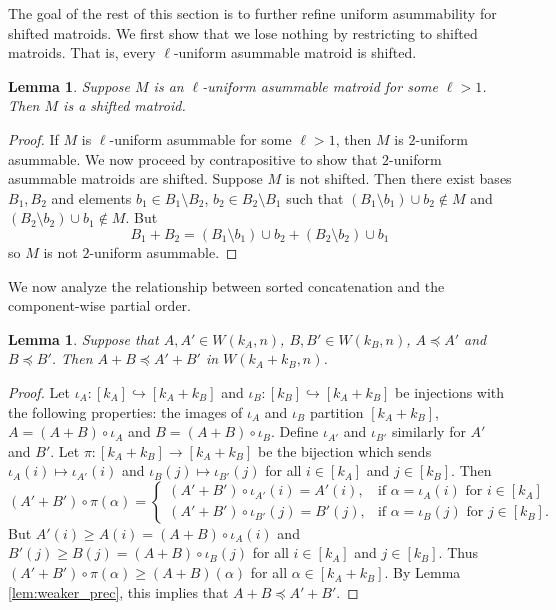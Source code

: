 \documentclass[10pt,a4paper]{amsart}
\theoremstyle{definition}
\theoremstyle{plain}
\newtheorem{lemma}[defn]{Lemma}
\begin{document}
The goal of the rest of this section is to further refine uniform asummability for shifted matroids. We first show that we lose nothing by restricting to shifted matroids. That is, every $\ell$-uniform asummable matroid is shifted.

\begin{lemma}
  \label{lem:assum->shifted}
Suppose $M$ is an $\ell$-uniform asummable matroid for some $\ell>1$. Then $M$ is a shifted matroid.
\end{lemma}
\begin{proof}
  If $M$ is $\ell$-uniform asummable for some $\ell>1$, then $M$ is $2$-uniform asummable. We now proceed by contrapositive to show that $2$-uniform asummable matroids are shifted. Suppose $M$ is not shifted. Then there exist bases $B_1,B_2$ and elements $b_1\in B_1\setminus B_2$, $b_2\in B_2\setminus B_1$ such that $(B_1\setminus b_1)\cup b_2\not\in M$ and $(B_2\setminus b_2)\cup b_1 \not\in M$. But
  \[B_1+B_2 = (B_1\setminus b_1)\cup b_2 +(B_2\setminus b_2)\cup b_1 \]
  so $M$ is not $2$-uniform asummable. 
\end{proof}

We now analyze the relationship between sorted concatenation and the component-wise partial order.

\begin{lemma}\label{lem:prec_conc}
Suppose that $A,A'\in W(k_A,n)$, $B,B'\in W(k_B,n)$, $A\preceq A'$ and $B\preceq B'$. Then $A+B\preceq A'+B'$ in $W(k_A+k_B,n)$. 
\end{lemma}
\begin{proof}
  Let $\iota_A:[k_A]\hookrightarrow [k_A+k_B]$ and $\iota_B:[k_B]\hookrightarrow [k_A+k_B]$ be injections with the following properties: the images of $\iota_A$ and $\iota_B$ partition $[k_A+k_B]$, $A=(A+B)\circ\iota_A$ and $B=(A+B)\circ\iota_B$. Define $\iota_{A'}$ and $\iota_{B'}$ similarly for $A'$ and $B'$. Let $\pi:[k_A+k_B]\to [k_A+k_B]$ be the bijection which sends $\iota_{A}(i)\mapsto \iota_{A'}(i)$ and $\iota_{B}(j)\mapsto \iota_{B'}(j)$ for all $i\in[k_A]$ and $j\in[k_B]$. Then
  \[(A'+B')\circ\pi(\alpha) = \begin{cases}
                       (A'+B')\circ \iota_{A'}(i) = {A'}(i), & \text{if $\alpha=\iota_A(i)$ for $i\in[k_A]$}\\
                       (A'+B')\circ \iota_{B'}(j) = {B'}(j), & \text{if $\alpha=\iota_B(j)$ for $j\in[k_B]$.}
                     \end{cases}\]
But ${A'}(i)\geq A(i)=(A+B)\circ\iota_A(i)$ and ${B'}(j)\geq B(j)=(A+B)\circ\iota_B(j)$ for all $i\in[k_A]$ and $j\in[k_B]$. Thus $(A'+B')\circ \pi(\alpha)\geq (A+B)(\alpha)$ for all $\alpha\in[k_A+k_B]$. By Lemma \ref{lem:weaker_prec}, this implies that $A+B\preceq A'+B'$.
\end{proof}
\end{document}
